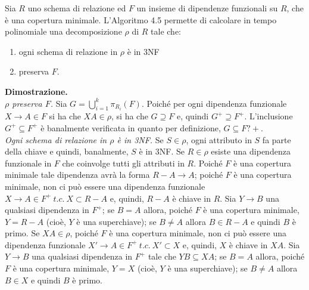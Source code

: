 \begin{theo}
Sia $R$ uno schema di relazione ed $F$ un insieme di dipendenze funzionali su $R$, che è una copertura minimale. 
L'Algoritmo 4.5 permette di calcolare in tempo polinomiale una decomposizione $\rho$ di $R$ tale che:
\begin{enumerate}
 \item ogni schema di relazione in $\rho$ è in 3NF
 \item preserva $F$.
\end{enumerate}
\end{theo}
\textbf{Dimostrazione.}\\
\emph{$\rho$ preserva $F$.} Sia $G = \bigcup_{i=1}^k \pi_{R_i}(F)$. Poiché per ogni dipendenza funzionale $X 
\rightarrow A \in F$ si ha che $XA \in \rho$, si ha che $G \supseteq F$ e, quindi $G^+ \supseteq F^+$. 
L'inclusione $G^+ \subseteq F^+$ è banalmente verificata in quanto per definizione, $G\subseteq F?+$. \\
\emph{Ogni schema di relazione in $\rho$ è in 3NF.}
Se $S \in \rho$, ogni attributo in $S$ fa parte della chiave e quindi, banalmente, $S$ è in 3NF. Se $R \in \rho$
esiste una dipendenza funzionale in $F$ che coinvolge tutti gli attributi in $R$. Poiché $F$ è una copertura minimale
tale dipendenza avrà la forma $R-A \rightarrow A$; poiché $F$ è una copertura minimale, non ci può essere una 
dipendenza funzionale $X \rightarrow A \in F^+\ t.c.\ X \subset R-A$ e, quindi, $R-A$ è chiave in $R$.
Sia $Y \rightarrow B$ una qualsiasi dipendenza in $F^+$; se $B = A$ allora, poiché $F$ è una copertura minimale, 
$Y = R-A$ (cioè, $Y$ è una superchiave); se $B \not= A$ allora $B \in R-A$ e quindi $B$ è primo.
Se $XA \in \rho$, poiché $F$ è una copertura minimale, non ci può essere una dipendenza funzionale $X' \rightarrow A 
\in F^+\ t.c.\ X' \subset X$ e, quindi, $X$ è chiave in $XA$. Sia $Y \rightarrow B$ una qualsiasi dipendenza in $F^+$ 
tale che $YB \subseteq XA$; se $B = A$ allora, poiché $F$ è una copertura minimale, $Y = X$ (cioè, $Y$ è una 
superchiave); se $B \not= A$ allora $B \in X$ e quindi $B$ è primo.

